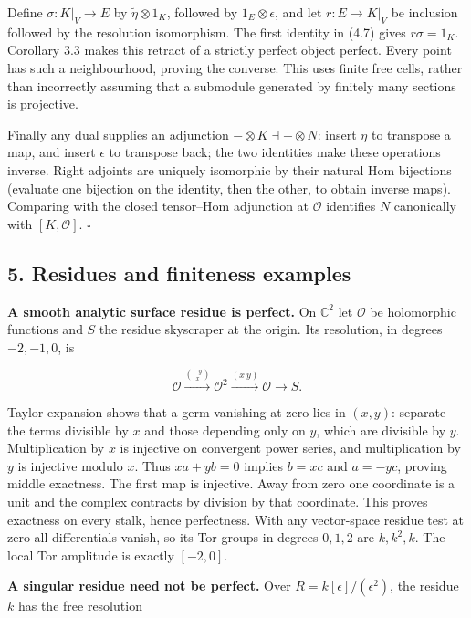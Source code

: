 \documentclass[
  english,
  11pt,
  a4paper,
]{article}
\begin{document}
Define \(\sigma:K|_V\to E\) by \(\widetilde\eta\otimes1_K\), followed by
\(1_E\otimes\epsilon\), and let \(r:E\to K|_V\) be inclusion followed by
the resolution isomorphism. The first identity in (4.7) gives
\(r\sigma=1_K\). Corollary 3.3 makes this retract of a strictly perfect
object perfect. Every point has such a neighbourhood, proving the
converse. This uses finite free cells, rather than incorrectly assuming
that a submodule generated by finitely many sections is projective.

Finally any dual supplies an adjunction \(-\otimes K\dashv-\otimes N\):
insert \(\eta\) to transpose a map, and insert \(\epsilon\) to transpose
back; the two identities make these operations inverse. Right adjoints
are uniquely isomorphic by their natural Hom bijections (evaluate one
bijection on the identity, then the other, to obtain inverse maps).
Comparing with the closed tensor--Hom adjunction at \(\mathcal O\)
identifies \(N\) canonically with \([K,\mathcal O]\). \(\square\)

\subsection{5. Residues and finiteness
examples}\label{perfect-complexes-and-duals--5-residues-and-finiteness-examples}

\textbf{A smooth analytic surface residue is perfect.} On
\(\mathbb C^2\) let \(\mathcal O\) be holomorphic functions and \(S\)
the residue skyscraper at the origin. Its resolution, in degrees
\(-2,-1,0\), is

\[\mathcal O\xrightarrow{\binom{-y}{x}}\mathcal O^2
\xrightarrow{(x\ y)}\mathcal O\longrightarrow S.
\tag{5.1}\]

Taylor expansion shows that a germ vanishing at zero lies in \((x,y)\):
separate the terms divisible by \(x\) and those depending only on \(y\),
which are divisible by \(y\). Multiplication by \(x\) is injective on
convergent power series, and multiplication by \(y\) is injective modulo
\(x\). Thus \(xa+yb=0\) implies \(b=xc\) and \(a=-yc\), proving middle
exactness. The first map is injective. Away from zero one coordinate is
a unit and the complex contracts by division by that coordinate. This
proves exactness on every stalk, hence perfectness. With any
vector-space residue test at zero all differentials vanish, so its Tor
groups in degrees \(0,1,2\) are \(k,k^2,k\). The local Tor amplitude is
exactly \([-2,0]\).

\textbf{A singular residue need not be perfect.} Over
\(R=k[\epsilon]/(\epsilon^2)\), the residue \(k\) has the free
resolution
\end{document}
